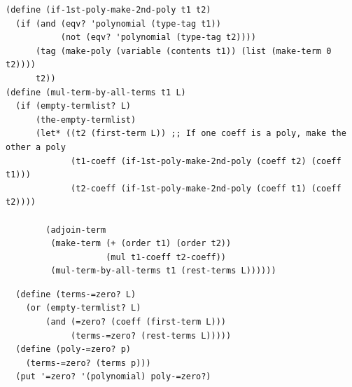 \documentclass[final,fleqn,titlepage,twoside]{article}
\begin{document}
\begin{verbatim}
(define (if-1st-poly-make-2nd-poly t1 t2)
  (if (and (eqv? 'polynomial (type-tag t1))
           (not (eqv? 'polynomial (type-tag t2))))
      (tag (make-poly (variable (contents t1)) (list (make-term 0 t2))))
      t2))
(define (mul-term-by-all-terms t1 L)
  (if (empty-termlist? L)
      (the-empty-termlist)
      (let* ((t2 (first-term L)) ;; If one coeff is a poly, make the other a poly
             (t1-coeff (if-1st-poly-make-2nd-poly (coeff t2) (coeff t1)))
             (t2-coeff (if-1st-poly-make-2nd-poly (coeff t1) (coeff t2))))
        
        (adjoin-term
         (make-term (+ (order t1) (order t2))
                    (mul t1-coeff t2-coeff))
         (mul-term-by-all-terms t1 (rest-terms L))))))
\end{verbatim}

\begin{verbatim}
  (define (terms-=zero? L)
    (or (empty-termlist? L)
        (and (=zero? (coeff (first-term L)))
             (terms-=zero? (rest-terms L)))))
  (define (poly-=zero? p)
    (terms-=zero? (terms p)))
  (put '=zero? '(polynomial) poly-=zero?)
\end{verbatim}
\end{document}
